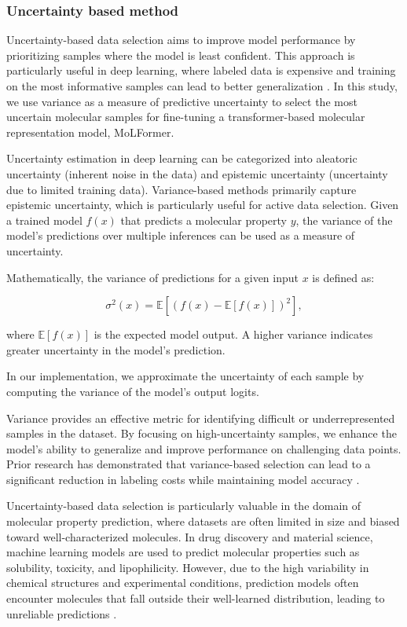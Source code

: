 \documentclass[11pt]{article}
\begin{document}
\subsubsection{Uncertainty based method}
\label{Uncertainty based method}
Uncertainty-based data selection aims to improve model performance by prioritizing samples where the model is least confident. This approach is particularly useful in deep learning, where labeled data is expensive and training on the most informative samples can lead to better generalization \cite{lin2023optimal}. In this study, we use variance as a measure of predictive uncertainty to select the most uncertain molecular samples for fine-tuning a transformer-based molecular representation model, MoLFormer.

Uncertainty estimation in deep learning can be categorized into aleatoric uncertainty (inherent noise in the data) and epistemic uncertainty (uncertainty due to limited training data). Variance-based methods primarily capture epistemic uncertainty, which is particularly useful for active data selection. Given a trained model \( f(x) \) that predicts a molecular property \( y \), the variance of the model's predictions over multiple inferences can be used as a measure of uncertainty.

Mathematically, the variance of predictions for a given input \( x \) is defined as:

\begin{equation}
    \sigma^2(x) = \mathbb{E}[(f(x) - \mathbb{E}[f(x)])^2],
\end{equation}

where \( \mathbb{E}[f(x)] \) is the expected model output. A higher variance indicates greater uncertainty in the model’s prediction.

In our implementation, we approximate the uncertainty of each sample by computing the variance of the model's output logits. 

Variance provides an effective metric for identifying difficult or underrepresented samples in the dataset. By focusing on high-uncertainty samples, we enhance the model’s ability to generalize and improve performance on challenging data points. Prior research has demonstrated that variance-based selection can lead to a significant reduction in labeling costs while maintaining model accuracy \cite{lin2023optimal}.

Uncertainty-based data selection is particularly valuable in the domain of molecular property prediction, where datasets are often limited in size and biased toward well-characterized molecules. In drug discovery and material science, machine learning models are used to predict molecular properties such as solubility, toxicity, and lipophilicity. However, due to the high variability in chemical structures and experimental conditions, prediction models often encounter molecules that fall outside their well-learned distribution, leading to unreliable predictions \cite{nigam2021assigning}.
\end{document}

